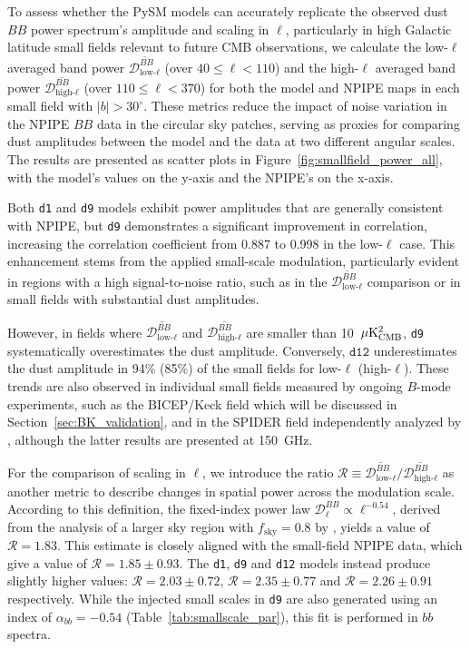 \documentclass[twocolumn]{aastex631}
\begin{document}
To assess whether the PySM models can accurately replicate the observed dust $BB$ power spectrum's amplitude and scaling in $\ell$, particularly in high Galactic latitude small fields relevant to future CMB observations, we calculate the low-$\ell$ averaged band power $\overline{\mathcal{D}_{\text{low-}\ell}^{BB}}$ (over $40 \le \ell < 110$) and the high-$\ell$ averaged band power $\overline{\mathcal{D}_{\text{high-}\ell}^{BB}}$ (over $110 \le \ell < 370$) for both the model and NPIPE maps in each small field with $|b| > 30^\circ$. These metrics reduce the impact of noise variation in the NPIPE $BB$ data in the circular sky patches, serving as proxies for comparing dust amplitudes between the model and the data at two different angular scales. The results are presented as scatter plots in Figure~\ref{fig:smallfield_power_all}, with the model's values on the y-axis and the NPIPE's on the x-axis.

Both \texttt{d1} and \texttt{d9} models exhibit power amplitudes that are generally consistent with NPIPE, but \texttt{d9} demonstrates a significant improvement in correlation, increasing the correlation coefficient from 0.887 to 0.998 in the low-$\ell$ case. This enhancement stems from the applied small-scale modulation, particularly evident in regions with a high signal-to-noise ratio, such as in the $\overline{\mathcal{D}_{\text{low-}\ell}^{BB}}$ comparison or in small fields with substantial dust amplitudes. 

However, in fields where $\overline{\mathcal{D}_{\text{low-}\ell}^{BB}}$ and $\overline{\mathcal{D}_{\text{high-}\ell}^{BB}}$ are smaller than 10~$\mu\rm{K^2_{CMB}}$, \texttt{d9} systematically overestimates the dust amplitude. Conversely, $\texttt{d12}$ underestimates the dust amplitude in 94\% (85\%) of the small fields for low-$\ell$ (high-$\ell$). These trends are also observed in individual small fields measured by ongoing $B$-mode experiments, such as the BICEP/Keck field which will be discussed in Section~\ref{sec:BK_validation}, and in the SPIDER field independently analyzed by \cite{SPIDERCollaboration:2024}, although the latter results are presented at 150~GHz.

For the comparison of scaling in $\ell$, we introduce the ratio $\mathcal{R} \equiv \overline{\mathcal{D}_{\text{low-}\ell}^{BB}} \Big/ \overline{\mathcal{D}_{\text{high-}\ell}^{BB}}$ as another metric to describe changes in spatial power across the modulation scale. According to this definition, the fixed-index power law $\mathcal{D}_\ell^{BB} \propto \ell^{-0.54}$, derived from the analysis of a larger sky region with $f_\text{sky} = 0.8$ by \cite{planck2016-l11A}, yields a value of $\mathcal{R} = 1.83$. This estimate is closely aligned with the small-field NPIPE data, which give a value of $\mathcal{R} = 1.85 \pm 0.93$. The \texttt{d1}, \texttt{d9} and \texttt{d12} models instead produce slightly higher values: $\mathcal{R} = 2.03 \pm 0.72$, $\mathcal{R} = 2.35 \pm 0.77$ and $\mathcal{R} = 2.26 \pm 0.91$ respectively. While the injected small scales in \texttt{d9} are also generated using an index of $\alpha_{bb} = -0.54$ (Table~\ref{tab:smallscale_par}), this fit is performed in $bb$ spectra. 
\end{document}
